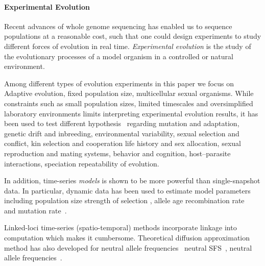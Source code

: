 \documentclass[11pt]{article}
\begin{document}
\paragraph{Experimental Evolution}
Recent advances of whole genome sequencing has enabled us to sequence 
populations at a reasonable cost, such that one could design experiments
to study different forces of evolution in real time. \emph{Experimental 
evolution} is the study of the evolutionary processes of a model organism in a 
controlled  
\cite{hegreness2006equivalence,lang2013pervasive,orozco2012adaptation,
	lang2011genetic,barrick2009genome,bollback2007clonal,oz2014strength} 
or natural 
	\cite{maldarelli2013hiv,reid2011new,denef2012situ,winters2012development,
	daniels2013genetic,barrett2008natural,bergland2014genomic} environment.

Among different types of evolution experiments \cite{Barrick2013Genome} in this 
paper we focus on Adaptive evolution, fixed population size, multicellular 
sexual organisms. While constraints such as small population sizes, limited 
timescales and oversimplified  laboratory
 environments limits interpreting experimental evolution results, it has
  been used to test different hypothesis~\cite{kawecki2012experimental}
   regarding
mutation and adaptation, 
genetic drift and inbreeding, 
environmental variability,
sexual selection and conflict, 
kin selection and cooperation
life history and sex allocation, 
sexual reproduction and mating systems, 
behavior and cognition, 
host–parasite interactions, 
speciation
repeatability of evolution.

In addition, time-series \emph{models} is shown to be more powerful 
\cite{boyko2008assessing,desai2008polymorphism,sawyer1992population} 
than single-snapshot data.
In particular, dynamic data has been used to estimate model parameters 
including population size
\cite{williamson1999using,wang2001pseudo,pollak1983new,waples1989generalized,
	Terhorst2015Multi}
strength of selection
\cite{mathieson2013estimating,illingworth2011distinguishing,Terhorst2015Multi,
	bollback2008estimation,illingworth2012quantifying,malaspinas2012estimating,
	Steinrücken2014a, malaspinas2012estimating}, allele age
 \cite{malaspinas2012estimating}
recombination rate~\cite{Terhorst2015Multi}  and mutation
 rate~\cite{Barrick2013Genome, Terhorst2015Multi}. 

Linked-loci time-series (spatio-temporal) methods 
\cite{illingworth2011distinguishing,illingworth2012quantifying,
	Barrick2013Genome,Terhorst2015Multi} incorporate linkage into computation
 which makes it cumbersome. Theoretical diffusion approximation method has also 
 developed for neutral allele frequencies~\cite{Ewens2012Mathematical, 
 kimura1955solution}
neutral SFS~\cite{evans2007non}, neutral allele
 frequencies~\cite{song2012simple}.
\end{document}
